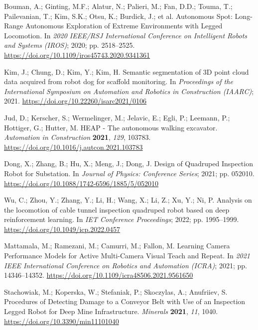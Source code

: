 Bouman, A.; Ginting, M.F.; Alatur, N.; Palieri, M.; Fan, D.D.; Touma, T.; Pailevanian, T.; Kim, S.K.; Otsu, K.; Burdick, J.; et al. Autonomous Spot: Long-Range Autonomous Exploration of Extreme Environments with Legged Locomotion. In \emph{2020 IEEE/RSJ International Conference on Intelligent Robots and Systems (IROS)}; 2020; pp. 2518--2525. \url{https://doi.org/10.1109/iros45743.2020.9341361}

Kim, J.; Chung, D.; Kim, Y.; Kim, H. Semantic segmentation of 3D point cloud data acquired from robot dog for scaffold monitoring. In \emph{Proceedings of the International Symposium on Automation and Robotics in Construction (IAARC)}; 2021. \url{https://doi.org/10.22260/isarc2021/0106}

Jud, D.; Kerscher, S.; Wermelinger, M.; Jelavic, E.; Egli, P.; Leemann, P.; Hottiger, G.; Hutter, M. HEAP - The autonomous walking excavator. \emph{Automation in Construction} \textbf{2021}, \emph{129}, 103783. \url{https://doi.org/10.1016/j.autcon.2021.103783}

Dong, X.; Zhang, B.; Hu, X.; Meng, J.; Dong, J. Design of Quadruped Inspection Robot for Substation. In \emph{Journal of Physics: Conference Series}; 2021; pp. 052010. \url{https://doi.org/10.1088/1742-6596/1885/5/052010}

Wu, C.; Zhou, Y.; Zhang, Y.; Li, H.; Wang, X.; Li, Z.; Xu, Y.; Ni, P. Analysis on the locomotion of cable tunnel inspection quadruped robot based on deep reinforcement learning. In \emph{IET Conference Proceedings}; 2022; pp. 1995--1999. \url{https://doi.org/10.1049/icp.2022.0457}

Mattamala, M.; Ramezani, M.; Camurri, M.; Fallon, M. Learning Camera Performance Models for Active Multi-Camera Visual Teach and Repeat. In \emph{2021 IEEE International Conference on Robotics and Automation (ICRA)}; 2021; pp. 14346--14352. \url{https://doi.org/10.1109/icra48506.2021.9561650}

Stachowiak, M.; Koperska, W.; Stefaniak, P.; Skoczylas, A.; Anufriiev, S. Procedures of Detecting Damage to a Conveyor Belt with Use of an Inspection Legged Robot for Deep Mine Infrastructure. \emph{Minerals} \textbf{2021}, \emph{11}, 1040. \url{https://doi.org/10.3390/min11101040}

